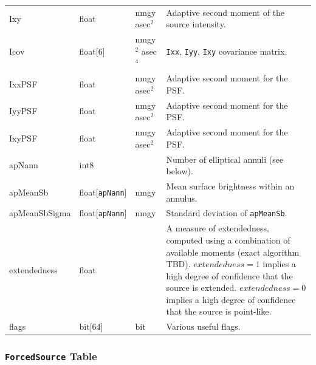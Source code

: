 \documentclass[12pt]{article}
\newcommand{\code}[1]{\texttt{#1}}
\newcommand{\ForcedSource}{\code{ForcedSource}\xspace}
\newcommand{\req}[1]{\marginpar{\tiny #1}}
\newcommand{\dmreq}[1]{\req{DMS-REQ-#1}}
\begin{document}
\begin{center}
\begin{longtable}{p{3cm}p{2cm}p{2cm}p{5cm}}
Ixy & float & nmgy asec$^{2}$ & Adaptive second moment of the source intensity. \\

Icov & float[6] & nmgy$^{2}$ asec$^{4}$ & \texttt{Ixx}, \texttt{Iyy}, \texttt{Ixy} covariance matrix. \\

IxxPSF & float & nmgy asec$^{2}$ & Adaptive second moment for the PSF. \\

IyyPSF & float & nmgy asec$^{2}$ & Adaptive second moment for the PSF. \\

IxyPSF & float & nmgy asec$^{2}$ & Adaptive second moment for the PSF. \\

apNann & int8 & ~ & Number of elliptical annuli (see below). \\

apMeanSb & float[\texttt{apNann}] & nmgy & Mean surface brightness within an annulus. \\

apMeanSbSigma & float[\texttt{apNann}] & nmgy & Standard deviation of \texttt{apMeanSb}. \\

extendedness & float & ~ & A measure of extendedness, computed using a combination of available moments
(exact algorithm TBD). $extendedness=1$ implies a high degree of confidence that the source is extended. $extendedness=0$ implies a high degree of confidence that the source is point-like. \\

flags & bit[64] & bit & Various useful flags. \\ \hline
\end{longtable}
\end{center}





\subsubsection{\ForcedSource Table}
\label{sec:forcedSourceTable}
\dmreq{0268}
\end{document}
